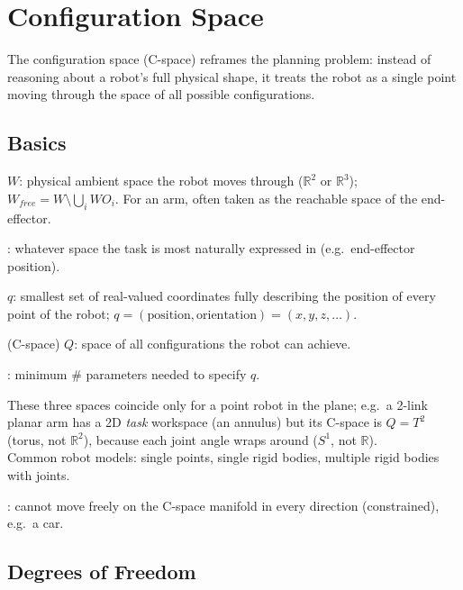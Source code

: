 \section{Configuration Space}

The configuration space (C-space) reframes the planning problem: instead of reasoning about a robot's full physical shape, it treats the robot as a single point moving through the space of all possible configurations.

\subsection{Basics}

 $W$: physical ambient space the robot moves through ($\mathbb{R}^2$ or $\mathbb{R}^3$); $W_{free}=W\setminus\bigcup_i WO_i$. For an arm, often taken as the reachable space of the end-effector.

: whatever space the task is most naturally expressed in (e.g.\ end-effector position).

 $q$: smallest set of real-valued coordinates fully describing the position of every point of the robot; $q=(\text{position},\text{orientation})=(x,y,z,\dots)$.

 (C-space) $Q$: space of all configurations the robot can achieve.

: minimum \# parameters needed to specify $q$.

These three spaces coincide only for a point robot in the plane; e.g.\ a 2-link planar arm has a 2D \emph{task} workspace (an annulus) but its C-space is $Q=T^2$ (torus, not $\mathbb{R}^2$), because each joint angle wraps around ($S^1$, not $\mathbb{R}$). \\
Common robot models: single points, single rigid bodies, multiple rigid bodies with joints.


: cannot move freely on the C-space manifold in every direction (constrained), e.g.\ a car.

\subsection{Degrees of Freedom}

